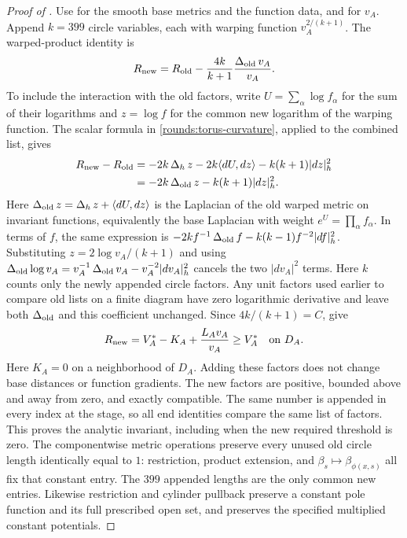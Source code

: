 \begin{proof}[Proof of ]
Use  for the
smooth base metrics and the function data, and
 for $v_A$.  Append
$k=399$ circle variables, each with warping function
$v_A^{2/(k+1)}$.  The warped-product identity is
\[
 R_{\rm new}=R_{\rm old}-\frac{4k}{k+1}
                    \frac{\operatorname{\Delta}_{\rm old}v_A}{v_A}.
\]
To include the interaction with the old factors, write
$U=\sum_\alpha\log f_\alpha$ for the sum of their logarithms and
$z=\log f$ for the common new logarithm of the warping function. The scalar formula
in \cref{rounds:torus-curvature}, applied to the combined list, gives
\begin{align*}
 R_{\rm new}-R_{\rm old}
 &=-2k\operatorname{\Delta}_hz-2k\langle dU,dz\rangle-k(k+1)|dz|_h^2\\
 &=-2k\operatorname{\Delta}_{\rm old}z-k(k+1)|dz|_h^2.
\end{align*}
Here $\operatorname{\Delta}_{\rm old}z=\operatorname{\Delta}_hz+\langle dU,dz\rangle$ is the
Laplacian of the old warped metric on invariant functions, equivalently
the base Laplacian with weight $e^U=\prod_\alpha f_\alpha$.
In terms of $f$, the same expression is
$-2k f^{-1}\operatorname{\Delta}_{\rm old}f-k(k-1)f^{-2}|df|_h^2$.
Substituting $z=2\log v_A/(k+1)$ and using
$\operatorname{\Delta}_{\rm old}\log v_A=v_A^{-1}\operatorname{\Delta}_{\rm old}v_A
-v_A^{-2}|dv_A|_h^2$ cancels the two $|dv_A|^2$ terms.
Here $k$ counts only the newly appended circle factors. Any unit
factors used earlier to compare old lists on a finite diagram have
zero logarithmic derivative and leave both $\operatorname{\Delta}_{\rm old}$ and this
coefficient unchanged. Since $4k/(k+1)=C$,  give
\[
 R_{\rm new}=V_A^*-K_A+\frac{L_Av_A}{v_A}
 \ge V_A^*\quad\hbox{on }D_A.
\]
Here $K_A=0$ on a neighborhood of $D_A$.  Adding these factors does
not change base distances or function gradients.  The new factors
are positive, bounded above and away from zero, and exactly compatible.
The same number is appended in every index at the stage, so all
end identities compare the same list of factors.  This proves the
analytic invariant, including when the new required threshold is zero.
The componentwise metric operations preserve every unused old circle
length identically equal to $1$: restriction, product extension, and
$\beta_s\mapsto\beta_{\phi(x,s)}$ all fix that constant entry.  The
$399$ appended lengths are the only common new entries.  Likewise
restriction and cylinder pullback preserve a constant pole function and
its full prescribed open set, and  preserves the
specified multiplied constant potentials.


\end{proof}
